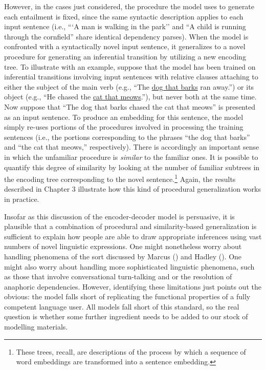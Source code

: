 However, in the cases just considered, the procedure the model uses to generate each entailment is fixed, since the same syntactic description applies to each input sentence (i.e., ```A man is walking in the park'' and ``A child is running through the cornfield'' share identical dependency parses). When the model is confronted with a syntactically novel input sentence, it generalizes to a novel procedure for generating an inferential transition by utilizing a new encoding tree. To illustrate with an example, suppose that the model has been trained on inferential transitions involving input sentences with relative clauses attaching to either the subject of the main verb (e.g., ``The \underline{dog that barks} ran away.'') or its object (e.g., ``He chased the \underline{cat that meows}.''), but never both at the same time. Now suppose that ``The dog that barks chased the cat that meows'' is presented as an input sentence. To produce an embedding for this sentence, the model simply re-uses portions of the procedures involved in processing the training sentences (i.e., the portions corresponding to the phrases ``the dog that barks'' and ``the cat that meows,'' respectively). There is accordingly an important sense in which the unfamiliar procedure is \textit{similar} to the familiar ones. It is possible to quantify this degree of similarity by looking at the number of familiar subtrees in the encoding tree corresponding to the novel sentence.\footnote{These trees, recall, are descriptions of the process by which a sequence of word embeddings are transformed into a sentence embedding.} Again, the results described in Chapter 3 illustrate how this kind of procedural generalization works in practice. 
 
Insofar as this discussion of the encoder-decoder model is persuasive, it is plausible that a combination of procedural and similarity-based generalization is sufficient to explain how people are able to draw appropriate inferences using vast numbers of novel linguistic expressions. One might nonetheless worry about handling phenomena of the sort discussed by Marcus (\citeyear{Marcus:1998}) and Hadley (\citeyear{Hadley:2009}). One might also worry about handling more sophisticated linguistic phenomena, such as those that involve conversational turn-talking and or the resolution of anaphoric dependencies. However, identifying these limitations just points out the obvious: the model falls short of replicating the functional properties of a fully competent language user. All models fall short of this standard, so the real question is whether some further ingredient needs to be added to our stock of modelling materials.

